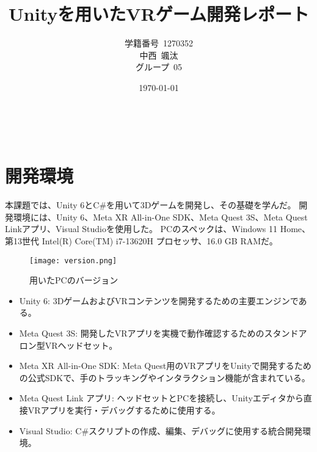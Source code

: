 \documentclass{jlreq}
\title{Unityを用いたVRゲーム開発レポート}
\author{学籍番号~1270352\\
        中西~颯汰\\
        グループ~05\\
        }
\date{\today}
\begin{document}
\maketitle
\clearpage　
\tableofcontents
\clearpage
\section{開発環境}
本課題では、Unity 6とC\#を用いて3Dゲームを開発し、その基礎を学んだ。
開発環境には、Unity 6、Meta XR All-in-One SDK、Meta Quest 3S、Meta Quest Linkアプリ、Visual Studioを使用した。
PCのスペックは、Windows 11 Home、第13世代 Intel(R) Core(TM) i7-13620H プロセッサ、16.0 GB RAMだ。
\begin{figure}[H]
    \centering
    \texttt{[image: version.png]}
    \caption{用いたPCのバージョン}
    \label{fig:kadai1}
\end{figure}
\begin{itemize}
  \item Unity 6: 3DゲームおよびVRコンテンツを開発するための主要エンジンである。
  \item Meta Quest 3S: 開発したVRアプリを実機で動作確認するためのスタンドアロン型VRヘッドセット。
  \item Meta XR All-in-One SDK: Meta Quest用のVRアプリをUnityで開発するための公式SDKで、手のトラッキングやインタラクション機能が含まれている。
  \item Meta Quest Link アプリ: ヘッドセットとPCを接続し、Unityエディタから直接VRアプリを実行・デバッグするために使用する。
  \item Visual Studio: C\#スクリプトの作成、編集、デバッグに使用する統合開発環境。
\end{itemize}
\end{document}
